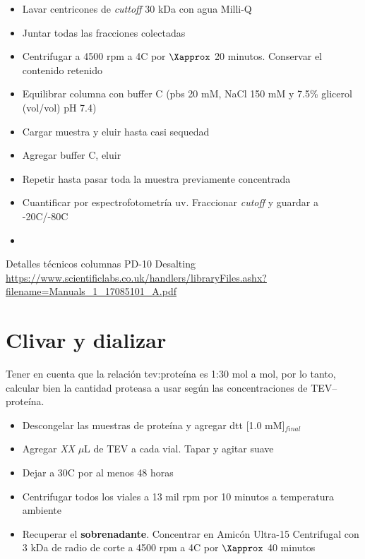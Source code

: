 \begin{appendix}
     \begin{itemize}
        \item{Lavar centricones de \textit{cuttoff} 30 kDa con agua Milli-Q}
        \item{Juntar todas las fracciones colectadas}
        \item{Centrifugar a 4500 \ac{rpm} a 4\textdegree C por $\Xapprox$ 20 minutos. Conservar el contenido retenido}
        \item{Equilibrar columna con buffer C (\ac{pbs} 20 mM, NaCl 150 mM y 7.5\% glicerol (vol/vol) pH 7.4)}
        \item{Cargar muestra y eluir hasta casi sequedad}
        \item{Agregar buffer C, eluir}
        \item{Repetir hasta pasar toda la muestra previamente concentrada}
    		\item{Cuantificar por espectrofotometría \ac{uv}. Fraccionar \textit{cutoff} y guardar a -20\textdegree C/-80\textdegree C}
    		\item{}
    \end{itemize}
    
Detalles técnicos columnas PD-10 Desalting \url{https://www.scientificlabs.co.uk/handlers/libraryFiles.ashx?filename=Manuals_1_17085101_A.pdf}


\section{Clivar y dializar}\label{Protocolo_TEV}

Tener en cuenta que la relación \ac{tev}:proteína es 1:30 mol a mol, por lo tanto, calcular bien la cantidad proteasa a usar según las concentraciones de TEV--proteína.

    \begin{itemize}
        \item{Descongelar las muestras de proteína y agregar \ac{dtt} [1.0 mM]$_{final}$}
        \item{Agregar \textit{XX} $\mu$L de TEV a cada vial. Tapar y agitar suave}
        \item{Dejar a 30\textdegree C por al menos 48 horas}
        \item{Centrifugar todos los viales a 13 mil \ac{rpm} por 10 minutos a temperatura ambiente}
        \item{Recuperar el \textbf{sobrenadante}. Concentrar en Amicón Ultra-15 Centrifugal con 3 kDa de radio de corte a 4500 \ac{rpm} a 4\textdegree C por $\Xapprox$ 40 minutos }


\end{itemize}
\end{appendix}
